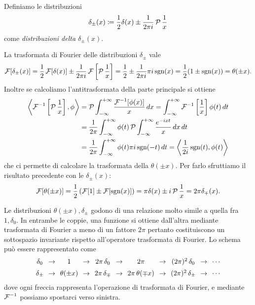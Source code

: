 \begin{definition} 
  Definiamo le distribuzioni 
  \begin{align}
    \delta_\pm(x) \coloneq \frac12\delta{(x)} \pm \frac1{2\pi i} \P\frac1x
  \end{align}
  come \textit{distribuzioni delta $ \delta_\pm(x) $}.
\end{definition}

\begin{example} %
  La trasformata di Fourier delle distribuzioni $ \delta_\pm $ vale 
  \begin{align}
    \F[\delta_\pm (x)] = \frac12\F[\delta(x)] \pm \frac1{2\pi i} \F\left[ \P\frac1x \right] 
    = \frac12 \pm \frac1{2\pi i} \pi i \sgn(x) = \frac12 (1 \pm \sgn(x)) = \theta(\pm x).
  \end{align}
  Inoltre se calcoliamo l'antitrasformata della parte principale si ottiene
  \begin{align}
    \sca{\F^{-1}\left[ \P\frac1x \right], \phi} &= \P\int_{-\infty}^{+\infty} \frac{\F^{-1}[\phi(x)]}{x} \,dx
    = \int_{-\infty}^{+\infty} \F^{-1}\left[ \frac1x \right] \phi(t) \,dt
    \\
    &= \frac1{2\pi} \int_{-\infty}^{+\infty} \phi(t) \P\int_{-\infty}^{+\infty} \frac{e^{-ixt}}{x} \,dx\,dt
    \\
    &= \frac1{2\pi} \int_{-\infty}^{+\infty} \phi(t) \pi i \sgn(-t)\,dt 
    = \sca{\frac1{2i}\sgn(t), \phi(t)}
  \end{align}
  che ci permette di calcolare la trasformata della $ \theta(\pm x) $. Per farlo sfruttiamo il risultato precedente con le $ \delta_\pm(x) $:
  \begin{align}
    \F[\theta(\pm x)] = \frac12\left( \F[1] \pm \F[\sgn(x)] \right) = \pi \delta(x) \pm i \P\frac1x = 2\pi \delta_{\mp}(x).
  \end{align}
\end{example}

\begin{remark}
  Le distribuzioni $ \theta(\pm x), \delta_\pm $ godono di una relazione molto simile a quella fra $ 1,\delta_0 $. 
  In entrambe le coppie, una funzione si ottiene dall'altra mediante trasformata di Fourier a meno di un fattore 
  $ 2\pi $ pertanto costituiscono un sottospazio invariante rispetto all'operatore trasformata di Fourier. Lo schema può essere rappresentato come 
  \begin{equation}
    \setlength{\arraycolsep}{0.35em}
    \begin{array}{ccccccccccc}
      \delta_0   & \to & 1               & \to & 2\pi\,\delta_0   & \to & 2\pi                & \to & (2\pi)^2\,\delta_0   & \to & \cdots \\[1.2ex]
      \delta_\pm & \to & \theta(\pm x)   & \to & 2\pi\,\delta_\mp & \to & 2\pi\,\theta(\mp x) & \to & (2\pi)^2\,\delta_\pm & \to & \cdots
    \end{array}
  \end{equation}
  dove ogni freccia rappresenta l'operazione di trasformata di Fourier, e mediante $ \F^{-1} $ possiamo spostarci verso sinistra.
\end{remark}

